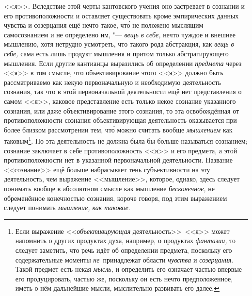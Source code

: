 <<{\em я}>>. Вследствие этой черты кантовского учения оно
застревает в сознании и его противоположности и оставляет существовать
кроме эмпирических данных чувства и созерцания ещё нечто такое, чт\'{о} не
положено мыслящим самосознанием и не определено им, "---
{\em вещь в себе,} нечто чуждое и внешнее мышлению,
хотя нетрудно усмотреть, что такого рода абстракция, как
{\em вещь в себе,} сама есть лишь продукт мышления и
притом только абстрагирующего мышления. Если другие
кантианцы
выразились об определении {\em предмета} через <<я>> в
том смысле, что объективирование этого <<я>> должно быть рассматриваемо как
некую первоначальную и необходимую деятельность сознания, так что в этой
первоначальной деятельности ещё нет представления о самом <<я>>, каковое
представление есть только некое сознание указанного сознания, или даже
объективирование этого сознания, то эта освобождённая от противоположности
сознания объективирующая деятельность оказывается при более близком
рассмотрении тем, чт\'{о} можно считать вообще {\em мышлением} как
таковым\footnote{Если выражение <<{\em объективирующая} деятельность>>~<<я>>
может напомнить о других продуктах духа, например, о продуктах
{\em фантазии,} то следует заметить, что речь идёт об
определении предмета, поскольку его содержательные моменты
{\em не}~принадлежат области {\em чувства} и
{\em созерцания}. Такой предмет есть некая
{\em мысль,} и определить его означает частью впервые его
продуцировать, частью же, поскольку он есть нечто предположенное, иметь о
нём дальнейшие мысли, мыслительно развивать его далее.}. Но эта деятельность
не должна была бы больше называться сознанием; сознание заключает в себе
противоположность <<я>> и его предмета, а этой противоположности нет в
указанной первоначальной деятельности. Название <<сознание>> ещё больше
набрасывает тень субъективности на эту деятельность, чем выражение
<<мышление>>,
которое, однако, здесь следует понимать вообще в абсолютном смысле как
мышление {\em бесконечное,} не обременённое конечностью
сознания, короче говоря, под этим выражением следует понимать
{\em мышление, как таковое}.

